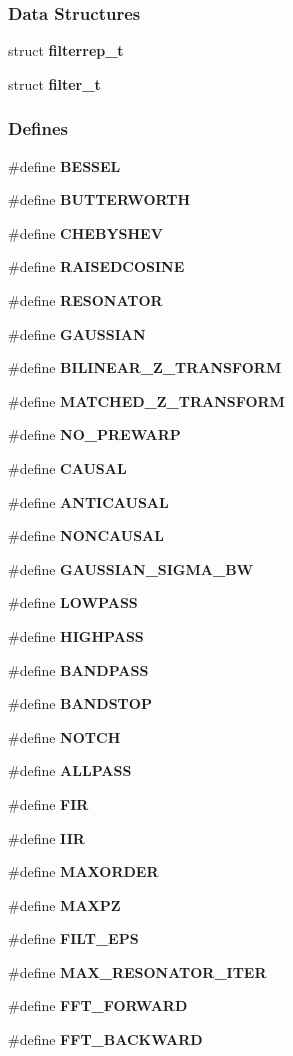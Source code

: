 \subsubsection*{Data Structures}
\begin{CompactItemize}
\item 
struct {\bf filterrep\_\-t}
\item 
struct {\bf filter\_\-t}
\end{CompactItemize}
\subsubsection*{Defines}
\begin{CompactItemize}
\item 
\#define {\bf BESSEL}
\item 
\#define {\bf BUTTERWORTH}
\item 
\#define {\bf CHEBYSHEV}
\item 
\#define {\bf RAISEDCOSINE}
\item 
\#define {\bf RESONATOR}
\item 
\#define {\bf GAUSSIAN}
\item 
\#define {\bf BILINEAR\_\-Z\_\-TRANSFORM}
\item 
\#define {\bf MATCHED\_\-Z\_\-TRANSFORM}
\item 
\#define {\bf NO\_\-PREWARP}
\item 
\#define {\bf CAUSAL}
\item 
\#define {\bf ANTICAUSAL}
\item 
\#define {\bf NONCAUSAL}
\item 
\#define {\bf GAUSSIAN\_\-SIGMA\_\-BW}
\item 
\#define {\bf LOWPASS}
\item 
\#define {\bf HIGHPASS}
\item 
\#define {\bf BANDPASS}
\item 
\#define {\bf BANDSTOP}
\item 
\#define {\bf NOTCH}
\item 
\#define {\bf ALLPASS}
\item 
\#define {\bf FIR}
\item 
\#define {\bf IIR}
\item 
\#define {\bf MAXORDER}
\item 
\#define {\bf MAXPZ}
\item 
\#define {\bf FILT\_\-EPS}
\item 
\#define {\bf MAX\_\-RESONATOR\_\-ITER}
\item 
\#define {\bf FFT\_\-FORWARD}
\item 
\#define {\bf FFT\_\-BACKWARD}
\end{CompactItemize}
